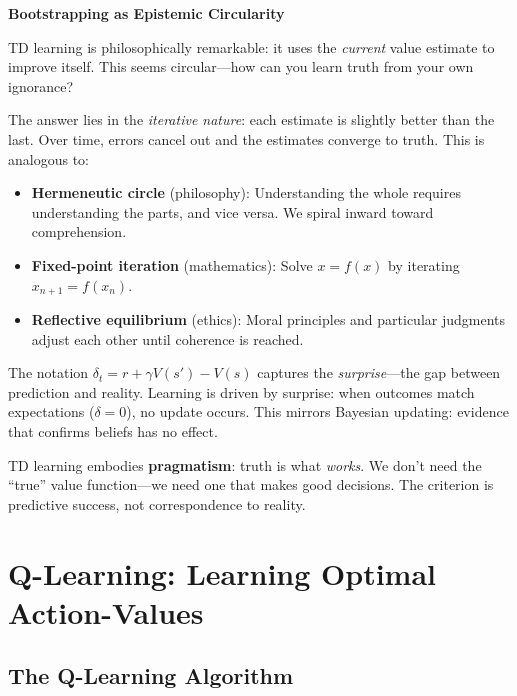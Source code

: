\begin{philobox}
\textbf{Bootstrapping as Epistemic Circularity}

TD learning is philosophically remarkable: it uses the \textit{current} value estimate to improve itself. This seems circular---how can you learn truth from your own ignorance?

The answer lies in the \textit{iterative nature}: each estimate is slightly better than the last. Over time, errors cancel out and the estimates converge to truth. This is analogous to:

\begin{itemize}
    \item \textbf{Hermeneutic circle} (philosophy): Understanding the whole requires understanding the parts, and vice versa. We spiral inward toward comprehension.
    
    \item \textbf{Fixed-point iteration} (mathematics): Solve $x = f(x)$ by iterating $x_{n+1} = f(x_n)$.
    
    \item \textbf{Reflective equilibrium} (ethics): Moral principles and particular judgments adjust each other until coherence is reached.
\end{itemize}

The notation $\delta_t = r + \gamma V(s') - V(s)$ captures the \textit{surprise}---the gap between prediction and reality. Learning is driven by surprise: when outcomes match expectations ($\delta = 0$), no update occurs. This mirrors Bayesian updating: evidence that confirms beliefs has no effect.

TD learning embodies \textbf{pragmatism}: truth is what \textit{works}. We don't need the ``true'' value function---we need one that makes good decisions. The criterion is predictive success, not correspondence to reality.
\end{philobox}

\section{Q-Learning: Learning Optimal Action-Values}

\subsection{The Q-Learning Algorithm}

